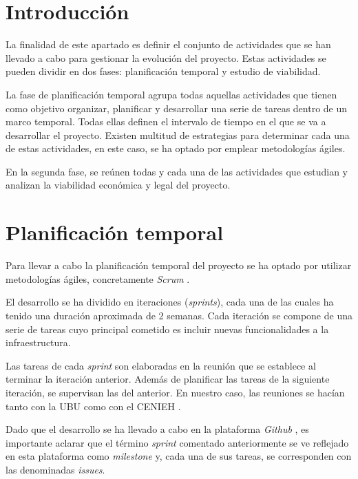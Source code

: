 
\section{Introducción}

La finalidad de este apartado es definir el conjunto de actividades que
se han llevado a cabo para gestionar la evolución del proyecto. 
Estas actividades se pueden dividir en dos fases: planificación temporal y 
estudio de viabilidad.

La fase de planificación temporal agrupa todas aquellas actividades que
tienen como objetivo organizar, planificar y desarrollar una serie de
tareas dentro de un marco temporal. Todas ellas definen el intervalo de
tiempo en el que se va a desarrollar el proyecto. Existen multitud de
estrategias para determinar cada una de estas actividades, en este caso,
se ha optado por emplear metodologías ágiles.

En la segunda fase, se reúnen todas y cada una de las actividades que
estudian y analizan la viabilidad económica y legal del proyecto.

\section{Planificación temporal}

Para llevar a cabo la planificación temporal del proyecto se ha optado
por utilizar metodologías ágiles, concretamente \emph{Scrum} \cite{scrum:web}.

El desarrollo se ha dividido en iteraciones (\emph{sprints}), cada una
de las cuales ha tenido una duración aproximada de 2 semanas. Cada
iteración se compone de una serie de tareas cuyo principal cometido es
incluir nuevas funcionalidades a la infraestructura.

Las tareas de cada \emph{sprint} son elaboradas en la reunión que se
establece al terminar la iteración anterior. Además de planificar las
tareas de la siguiente iteración, se supervisan las del anterior. En
nuestro caso, las reuniones se hacían tanto con la UBU \cite{ubu:web} como con el
CENIEH \cite{cenieh:web}.

Dado que el desarrollo se ha llevado a cabo en la plataforma
\emph{Github} \cite{github:web}, es importante aclarar que el término \emph{sprint}
comentado anteriormente se ve reflejado en esta plataforma como
\emph{milestone} y, cada una de sus tareas, se corresponden con las
denominadas \emph{issues}.

